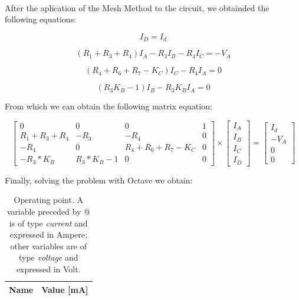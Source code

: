 \paragraph{} After the aplication of the Mesh Method to the circuit, we obtainded the following equations:

\begin{equation}
	I_D = I_d
	\label{eq:1}
\end{equation}

\begin{equation}
	(R_1 + R_3 + R_4) I_A -R_3 I_B - R_4 I_C = - V_A
	\label{eq:1}
\end{equation}

\begin{equation}
	(R_4 + R_6 + R_7 - K_C) I_C - R_4 I_A = 0
	\label{eq:2}
\end{equation}

\begin{equation}
	(R_3 K_B - 1) I_B - R_3 K_B I_A = 0
	\label{eq:3}
\end{equation}

From which we can obtain the following matrix equation:

\begin{equation}
\begin{bmatrix}
	0 & 0 & 0 & 1 \\
	R_1 + R_3 + R_4 &  -R_3 & - R_4 & 0 \\
	-R_4 & 0 & R_4 + R_6 + R_7 - K_C & 0 \\
	-R_3 * K_B & R_3 * K_B - 1 & 0 & 0
\end{bmatrix}
\times
\begin{bmatrix}
	I_A \\
	I_B \\
	I_C \\
	I_D
\end{bmatrix}
=
\begin{bmatrix}
	I_d \\
	-V_A \\
	0 \\
	0
	\label{m:1}
\end{bmatrix}
\end{equation}


Finally, solving the problem with Octave we obtain:

\begin{table}[hbt!]
  \centering
  \begin{tabular}{|l|r|}
    \hline    
    {\bf Name} & {\bf Value [mA]} \\ \hline
    
  \end{tabular}
  \caption{Operating point. A variable preceded by @ is of type {\em current}
    and expressed in Ampere; other variables are of type {\it voltage} and expressed in
    Volt.}
  \label{tab:op}
\end{table}


